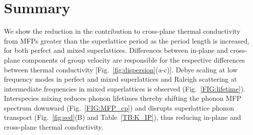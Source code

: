 

\section{Summary}

We show the reduction in the contribution to cross-plane thermal conductivity from MFPs greater than the superlattice period as the period length is increased, for both perfect and mixed superlattices. Differences between in-plane and cross-plane components of group velocity are responsible for the respective differences between thermal conductivity [Fig.~\ref{fig:dispersion}(a-c)]. Debye scaling at low frequency modes in perfect and mixed superlattices and Raleigh scattering at intermediate frequencies in mixed superlattices is observed (Fig.~\ref{FIG:lifetime}). Interspecies mixing reduces phonon lifetimes thereby shifting the phonon MFP spectrum downward (Fig.~\ref{FIG:MFP_cp}) and disrupts superlattice phonon transport (Fig.~\ref{fig:sed}(B) and Table~\ref{TB:K_IP}), thus reducing in-plane and cross-plane thermal conductivity.

